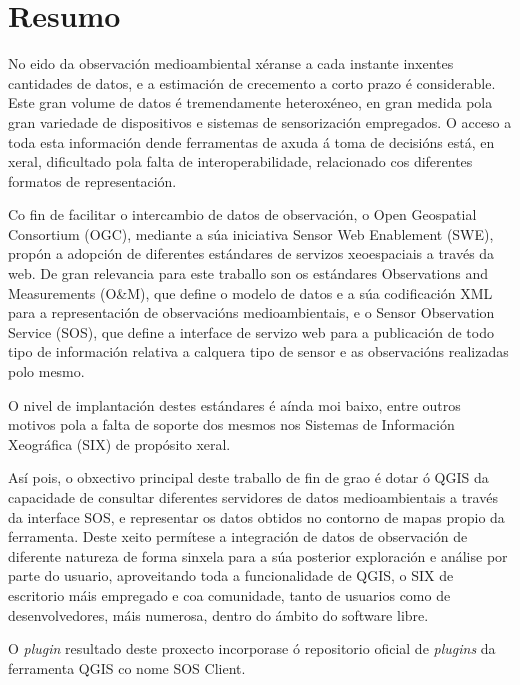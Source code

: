\pagestyle{plain}
\chapter*{Resumo}
No eido da observación medioambiental xéranse a cada instante inxentes cantidades de datos, e a estimación de crecemento a corto prazo é considerable. Este gran volume de datos é tremendamente heteroxéneo, en gran medida pola gran variedade de dispositivos e sistemas de sensorización empregados. O acceso a toda esta información dende ferramentas de axuda á toma de decisións está, en xeral, dificultado pola falta de interoperabilidade, relacionado cos diferentes formatos de representación.

Co fin de facilitar o intercambio de datos de observación, o Open Geospatial Consortium (OGC), mediante a súa iniciativa Sensor Web Enablement (SWE), propón a adopción de diferentes estándares de servizos xeoespaciais a través da web. De gran relevancia para este traballo son os estándares Observations and Measurements (O\&M), que define o modelo de datos e a súa codificación XML para a representación de observacións medioambientais, e o Sensor Observation Service (SOS), que define a interface de servizo web para a publicación de todo tipo de información relativa a calquera tipo de sensor e as observacións realizadas polo mesmo.

O nivel de implantación destes estándares é aínda moi baixo, entre outros motivos pola a falta de soporte dos mesmos nos Sistemas de Información Xeográfica (SIX) de propósito xeral.

Así pois, o obxectivo principal deste traballo de fin de grao é dotar ó QGIS da capacidade de consultar diferentes servidores de datos medioambientais a través da interface SOS, e representar os datos obtidos no contorno de mapas propio da ferramenta. Deste xeito permítese a integración de datos de observación de diferente natureza de forma sinxela para a súa posterior exploración e análise por parte do usuario, aproveitando toda a funcionalidade de QGIS, o SIX de escritorio máis empregado e coa comunidade, tanto de usuarios como de desenvolvedores, máis numerosa, dentro do ámbito do software libre.

O \emph{plugin} resultado deste proxecto incorporase ó repositorio oficial de \emph{plugins} da ferramenta QGIS co nome SOS Client.
